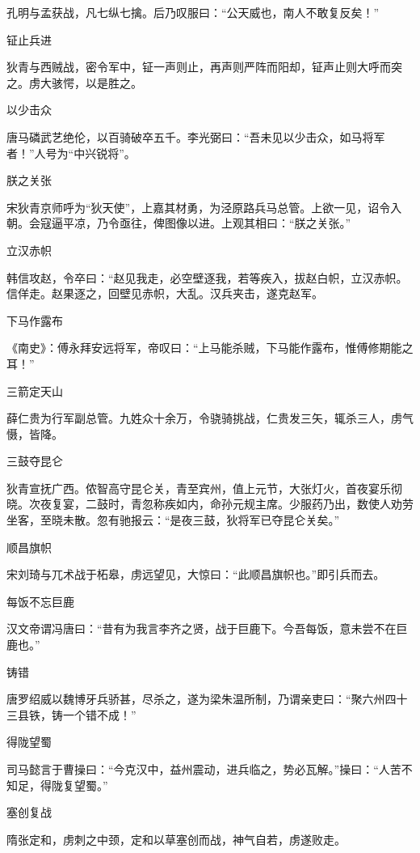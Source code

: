 \documentclass[a4paper,12pt,UTF8,twoside]{ctexbook}
\begin{document}
    孔明与孟获战，凡七纵七擒。后乃叹服曰：“公天威也，南人不敢复反矣！”
    
    钲止兵进
    
    狄青与西贼战，密令军中，钲一声则止，再声则严阵而阳却，钲声止则大呼而突之。虏大骇愕，以是胜之。
    
    以少击众
    
    唐马磷武艺绝伦，以百骑破卒五千。李光弼曰：“吾未见以少击众，如马将军者！”人号为“中兴锐将”。
    
    朕之关张
    
    宋狄青京师呼为“狄天使”，上嘉其材勇，为泾原路兵马总管。上欲一见，诏令入朝。会寇逼平凉，乃令亟往，俾图像以进。上观其相曰：“朕之关张。”
    
    立汉赤帜
    
    韩信攻赵，令卒曰：“赵见我走，必空壁逐我，若等疾入，拔赵白帜，立汉赤帜。信佯走。赵果逐之，回壁见赤帜，大乱。汉兵夹击，遂克赵军。
    
    下马作露布
    
    《南史》：傅永拜安远将军，帝叹曰：“上马能杀贼，下马能作露布，惟傅修期能之耳！”
    
    三箭定天山
    
    薛仁贵为行军副总管。九姓众十余万，令骁骑挑战，仁贵发三矢，辄杀三人，虏气慑，皆降。
    
    三鼓夺昆仑
    
    狄青宣抚广西。侬智高守昆仑关，青至宾州，值上元节，大张灯火，首夜宴乐彻晓。次夜复宴，二鼓时，青忽称疾如内，命孙元规主席。少服药乃出，数使人劝劳坐客，至晓未散。忽有驰报云：“是夜三鼓，狄将军已夺昆仑关矣。”
    
    顺昌旗帜
    
    宋刘琦与兀术战于柘皋，虏远望见，大惊曰：“此顺昌旗帜也。”即引兵而去。
    
    每饭不忘巨鹿
    
    汉文帝谓冯唐曰：“昔有为我言李齐之贤，战于巨鹿下。今吾每饭，意未尝不在巨鹿也。”
    
    铸错
    
    唐罗绍威以魏博牙兵骄甚，尽杀之，遂为梁朱温所制，乃谓亲吏曰：“聚六州四十三县铁，铸一个错不成！”
    
    得陇望蜀
    
    司马懿言于曹操曰：“今克汉中，益州震动，进兵临之，势必瓦解。”操曰：“人苦不知足，得陇复望蜀。”
    
    塞创复战
    
    隋张定和，虏刺之中颈，定和以草塞创而战，神气自若，虏遂败走。
    
\end{document}
